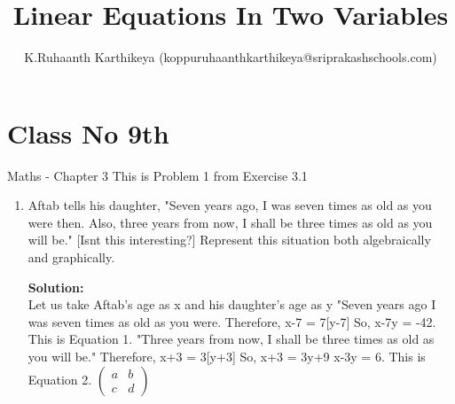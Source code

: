 \documentclass[12pt]{article}
\title{Linear Equations In Two Variables}
\author{K.Ruhaanth Karthikeya (koppuruhaanthkarthikeya@sriprakashschools.com)}
\newcommand{\myvec}[1]{\ensuremath{\begin{pmatrix}#1\end{pmatrix}}}
\newcommand{\solution}{\noindent \textbf{Solution: }}
\begin{document}
\maketitle
\section*{Class No 9th} { Maths - Chapter 3}
This is Problem 1 from Exercise 3.1
\begin{enumerate}
\item Aftab tells his daughter, "Seven years ago,
I was seven times as old as you were then. Also, three years from 
now, I shall be three times as old as you will be." [Isnt this interesting?] Represent this situation both algebraically and graphically.

\solution \\ Let us take Aftab's age as x and his daughter's age as y
"Seven years ago I was seven times as old as you were.
Therefore, x-7 = 7[y-7]
So, x-7y = -42. This is Equation 1.
"Three years from now, I shall be three times as old as you will be."
Therefore, x+3 = 3[y+3]
So, x+3 = 3y+9 
x-3y = 6. This is Equation 2.
\myvec{a&b\\c&d} 

\end{enumerate}
\end{document}
